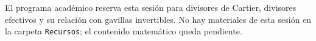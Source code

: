 \begin{nota}
El programa académico reserva esta sesión para divisores de Cartier, divisores efectivos y su relación con gavillas invertibles. No hay materiales de esta sesión en la carpeta \texttt{Recursos}; el contenido matemático queda pendiente.
\end{nota}
